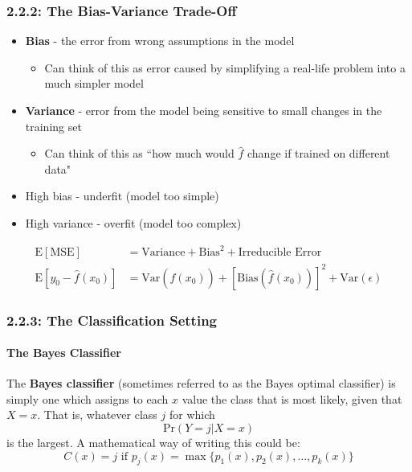 \subsubsection*{2.2.2: The  Bias-Variance Trade-Off}
\begin{itemize}
\item  \textbf{Bias} - the error from wrong assumptions in the model

  \begin{itemize}
  \tightlist
  \item  Can think of this as error caused by simplifying a real-life problem  into a much simpler model
  \end{itemize}
\item  \textbf{Variance} - error from the model being sensitive to small changes in the training set

  \begin{itemize}
  \tightlist
  \item    Can think of this as ``how much would \(\hat f\) change if trained  on different data"
  \end{itemize}
\item  High bias - underfit (model too simple)
\item  High variance - overfit (model too complex)
\end{itemize}

\begin{align*}
\text{E}[\text{MSE}]&=\text{Variance}+ \text{Bias}^2 + \text{Irreducible Error}\\
\text{E}[y_0 - \hat{f}(x_0)]&=\text{Var}(\hat f(x_0))+ [\text{Bias}(\hat f(x_0))]^2 + \text{Var}(\epsilon)
\end{align*}

\subsubsection*{2.2.3: The Classification Setting}\label{the-classification-setting}

\paragraph{The Bayes Classifier\\}


The \textbf{Bayes classifier} (sometimes referred to as the Bayes optimal classifier) is simply one which assigns to each \(x\) value the class that is most likely, given that \(X=x\). That is, whatever class \(j\) for which 
\begin{equation*}
\text{Pr}(Y=j | X=x)
\end{equation*}
is the largest. A mathematical way of writing this
could be: 
\begin{equation*} 
C(x) = j \text{ if } p_j(x) = \max\{p_1(x), p_2(x), \ldots, p_k(x)\}
\end{equation*}

